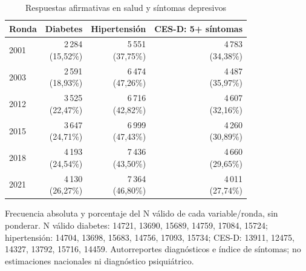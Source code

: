 \begin{table}[!htbp]
\centering
\caption{Respuestas afirmativas en salud y síntomas depresivos}\label{tab:eda-simple-salud}
\small\setlength{\tabcolsep}{4pt}
\renewcommand{\arraystretch}{1.15}
\begin{tabular}{lrrr}
\toprule
\textbf{Ronda} & \textbf{Diabetes} & \textbf{Hipertensión} & \textbf{CES-D: 5+ síntomas} \\
\midrule
2001 & \shortstack[r]{2\,284\\(15,52\%)} & \shortstack[r]{5\,551\\(37,75\%)} & \shortstack[r]{4\,783\\(34,38\%)} \\
2003 & \shortstack[r]{2\,591\\(18,93\%)} & \shortstack[r]{6\,474\\(47,26\%)} & \shortstack[r]{4\,487\\(35,97\%)} \\
2012 & \shortstack[r]{3\,525\\(22,47\%)} & \shortstack[r]{6\,716\\(42,82\%)} & \shortstack[r]{4\,607\\(32,16\%)} \\
2015 & \shortstack[r]{3\,647\\(24,71\%)} & \shortstack[r]{6\,999\\(47,43\%)} & \shortstack[r]{4\,260\\(30,89\%)} \\
2018 & \shortstack[r]{4\,193\\(24,54\%)} & \shortstack[r]{7\,436\\(43,50\%)} & \shortstack[r]{4\,660\\(29,65\%)} \\
2021 & \shortstack[r]{4\,130\\(26,27\%)} & \shortstack[r]{7\,364\\(46,80\%)} & \shortstack[r]{4\,011\\(27,74\%)} \\
\bottomrule
\end{tabular}
\par\medskip
\parbox{\linewidth}{\footnotesize Frecuencia absoluta y porcentaje del N válido de cada variable/ronda, sin ponderar. N válido diabetes: 14721, 13690, 15689, 14759, 17084, 15724; hipertensión: 14704, 13698, 15683, 14756, 17093, 15734; CES-D: 13911, 12475, 14327, 13792, 15716, 14459. Autorreportes diagnósticos e índice de síntomas; no estimaciones nacionales ni diagnóstico psiquiátrico.}
\end{table}
